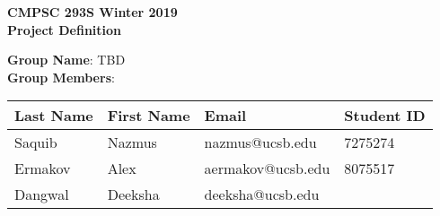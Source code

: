 \documentclass[12pt]{article}
\begin{document}
\begin{center}
\bfseries
\LARGE
CMPSC 293S Winter 2019\\
Project Definition\\[2em]
\end{center}

\noindent
\textbf{Group Name}: TBD\\
\noindent
\textbf{Group Members}:
\begin{table}[h]
\centering
\begin{tabular}{|l|l|l|l|}
\hline
\textbf{Last Name} & \textbf{First Name} & \textbf{Email} & \textbf{Student ID}\\
\hline
Saquib & Nazmus & nazmus@ucsb.edu & 7275274\\
\hline
Ermakov & Alex & aermakov@ucsb.edu & 8075517\\
\hline
Dangwal & Deeksha & deeksha@ucsb.edu & ~\\
\hline
\end{tabular}
\end{table}
\end{document}

